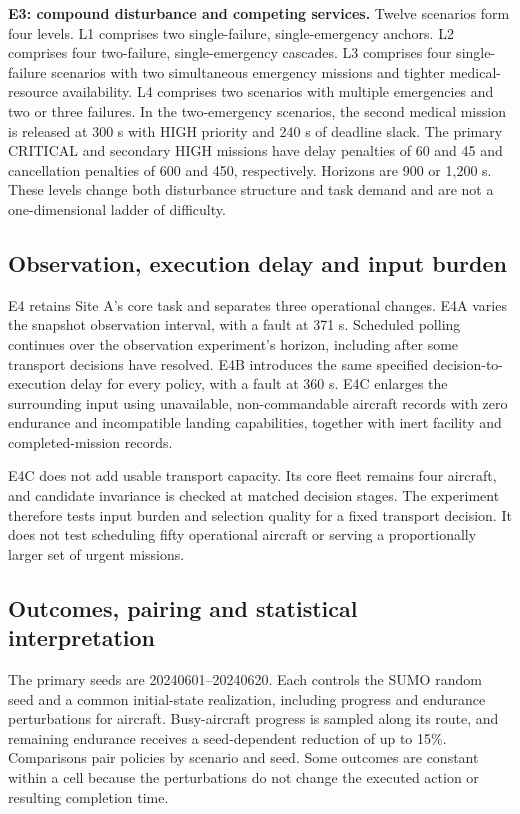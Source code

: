 \documentclass[]{interact}
\theoremstyle{plain}
\theoremstyle{definition}
\theoremstyle{remark}
\begin{document}
\textbf{E3: compound disturbance and competing services.} Twelve scenarios form four levels. L1 comprises two single-failure, single-emergency anchors. L2 comprises four two-failure, single-emergency cascades. L3 comprises four single-failure scenarios with two simultaneous emergency missions and tighter medical-resource availability. L4 comprises two scenarios with multiple emergencies and two or three failures. In the two-emergency scenarios, the second medical mission is released at 300 s with HIGH priority and 240 s of deadline slack. The primary CRITICAL and secondary HIGH missions have delay penalties of 60 and 45 and cancellation penalties of 600 and 450, respectively. Horizons are 900 or 1,200 s. These levels change both disturbance structure and task demand and are not a one-dimensional ladder of difficulty.

\subsection{Observation, execution delay and input burden}

E4 retains Site A's core task and separates three operational changes. E4A varies the snapshot observation interval, with a fault at 371 s. Scheduled polling continues over the observation experiment's horizon, including after some transport decisions have resolved. E4B introduces the same specified decision-to-execution delay for every policy, with a fault at 360 s. E4C enlarges the surrounding input using unavailable, non-commandable aircraft records with zero endurance and incompatible landing capabilities, together with inert facility and completed-mission records.

E4C does not add usable transport capacity. Its core fleet remains four aircraft, and candidate invariance is checked at matched decision stages. The experiment therefore tests input burden and selection quality for a fixed transport decision. It does not test scheduling fifty operational aircraft or serving a proportionally larger set of urgent missions.

\subsection{Outcomes, pairing and statistical interpretation}

The primary seeds are 20240601--20240620. Each controls the SUMO random seed and a common initial-state realization, including progress and endurance perturbations for aircraft. Busy-aircraft progress is sampled along its route, and remaining endurance receives a seed-dependent reduction of up to 15\%. Comparisons pair policies by scenario and seed. Some outcomes are constant within a cell because the perturbations do not change the executed action or resulting completion time.
\end{document}
